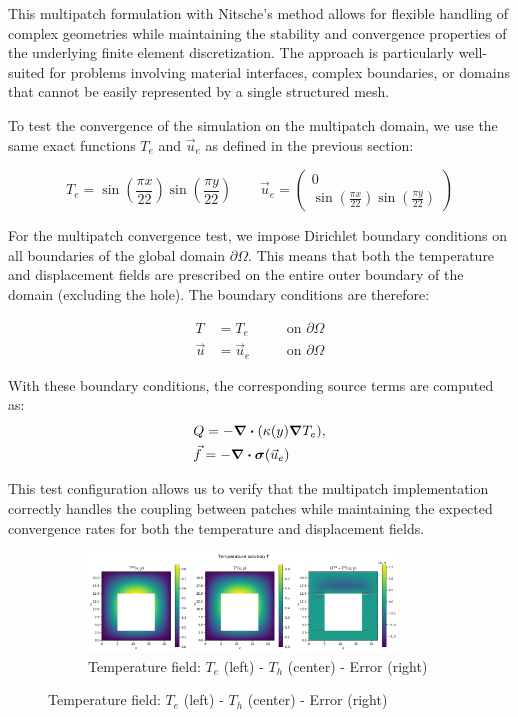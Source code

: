 \documentclass[a4paper,12pt,twoside]{report}
\begin{document}
This multipatch formulation with Nitsche's method allows for flexible handling of complex geometries while maintaining the stability and convergence properties of the underlying finite element discretization. The approach is particularly well-suited for problems involving material interfaces, complex boundaries, or domains that cannot be easily represented by a single structured mesh.

To test the convergence of the simulation on the multipatch domain, we use the same exact functions $T_e$ and $\vec{u}_e$ as defined in the previous section:

$$
T_e = \sin\left(\frac{\pi x}{22}\right) \sin\left(\frac{\pi y}{22}\right) \qquad \vec u_e = \begin{pmatrix}
	0 \\
	\sin\left(\frac{\pi x}{22}\right) \sin\left(\frac{\pi y}{22}\right) 
\end{pmatrix}
$$

For the multipatch convergence test, we impose Dirichlet boundary conditions on all boundaries of the global domain $\partial\Omega$. This means that both the temperature and displacement fields are prescribed on the entire outer boundary of the domain (excluding the hole). The boundary conditions are therefore:

\begin{align}
	T &= T_e \quad &&\text{on } \partial\Omega \\
	\vec u &= \vec u_e \quad &&\text{on } \partial\Omega
\end{align}

With these boundary conditions, the corresponding source terms are computed as:
\begin{equation*}
	\begin{aligned}
	& Q = - \div(\kappa(y) \grad T_e), \\
	& \vec f = -\div \boldsymbol{\sigma}(\vec u_e)
	\end{aligned}
\end{equation*}

This test configuration allows us to verify that the multipatch implementation correctly handles the coupling between patches while maintaining the expected convergence rates for both the temperature and displacement fields.

\begin{figure}[!h]
	\centering
	\begin{subfigure}[b]{\textwidth}
		\centering
		\includegraphics[width=0.9\textwidth]{figures/figures_multipatch/temperature.png}
		\caption{Temperature field: $T_e$ (left) - $T_h$ (center) - Error (right)}
	\end{subfigure}
\end{figure}
\end{document}
